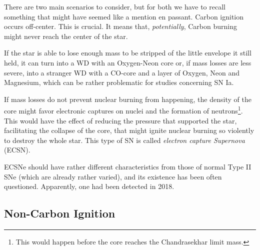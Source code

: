 \par There are two main scenarios to consider, but for both we have to recall something that might have seemed like a mention en passant. Carbon ignition occurs off-center. This is crucial. It means that, \emph{potentially}, Carbon burning might never reach the center of the star.
\par If the star is able to lose enough mass to be stripped of the little envelope it still held, it can turn into a WD with an Oxygen-Neon core or, if mass losses are less severe, into a stranger WD with a CO-core and a layer of Oxygen, Neon and Magnesium, which can be rather problematic for studies concerning SN Ia.
\par If mass losses do not prevent nuclear burning from happening, the density of the core might favor electronic captures on nuclei and the formation of neutrons\footnote{This would happen before the core reaches the Chandrasekhar limit mass.}. This would have the effect of reducing the pressure that supported the star, facilitating the collapse of the core, that might ignite nuclear burning so violently to destroy the whole star. This type of SN is called \emph{electron capture Supernova} (ECSN). 
\par ECSNe should have rather different characteristics from those of normal Type II SNe (which are already rather varied), and its existence has been often questioned. Apparently, one had been detected in 2018.

\subsection{Non-Carbon Ignition}

